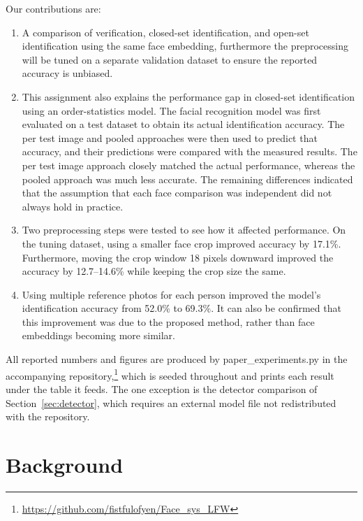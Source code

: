 \documentclass[conference]{IEEEtran}
\begin{document}
Our contributions are:

\begin{enumerate}
\item A comparison of verification, closed-set identification, and open-set identification using the same face embedding, furthermore the preprocessing will be tuned on a separate validation dataset to ensure the reported accuracy is unbiased.

\item This assignment also explains the performance gap in closed-set identification using an order-statistics model. The facial recognition model was first evaluated on a test dataset to obtain its actual identification accuracy. The per test image and pooled approaches were then used to predict that accuracy, and their predictions were compared with the measured results. The per test image approach closely matched the actual performance, whereas the pooled approach was much less accurate. The remaining differences indicated that the assumption that each face comparison was independent did not always hold in practice.

\item Two preprocessing steps were tested to see how it affected performance. On the tuning dataset, using a smaller face crop improved accuracy by 17.1\%. Furthermore, moving the crop window 18 pixels downward improved the accuracy by 12.7–14.6\%  while keeping the crop size the same.

\item Using multiple reference photos for each person improved the model's identification accuracy from 52.0\% to 69.3\%. It can also be confirmed that this improvement was due to the proposed method, rather than face embeddings becoming more similar.

\end{enumerate}

All reported numbers and figures are produced by
paper\_experiments.py in the accompanying
repository,\footnote{\url{https://github.com/fistfulofyen/Face_sys_LFW}} which is
seeded throughout and prints each result under the table it feeds. The one
exception is the detector comparison of Section~\ref{sec:detector}, which requires
an external model file not redistributed with the repository.

\section{Background}
\end{document}

